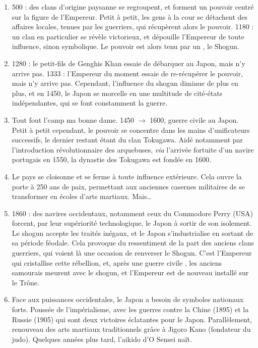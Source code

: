 \begin{enumerate}

\item 500 : des clans d'origine paysanne se regroupent, et forment un pouvoir
centré sur la figure de l'Empereur. Petit à petit, les gens à la cour se
détachent des affaires locales, tenues par les guerriers, qui récupèrent alors
le pouvoir. 1180 : un clan en particulier se révèle victorieux, et dépouille
l'Empereur de toute influence, sinon symbolique. Le pouvoir est alors tenu par
un , le Shogun.

\item 1280 : le petit-fils de Genghis Khan essaie de débarquer au Japon, mais
n'y arrive pas. 1333 : l'Empereur du moment essaie de re-récupérer le pouvoir,
mais n'y arrive pas. Cependant, l'influence du shogun diminue de plus en plus,
et en 1450, le Japon se morcelle en une multitude de cité-états indépendantes,
qui se font constamment la guerre.

\item Tout fout l'camp ma bonne dame. 1450 $\rightarrow$ 1600, guerre civile
au Japon. Petit à petit cependant, le pouvoir se concentre dans les mains
d'unificateurs successifs, le dernier restant étant du clan Tokugawa. Aidé
notamment par l'introduction révolutionnaire des arquebuses, \emph{via}
l'arrivée fortuite d'un navire portugais en 1550, la dynastie des Tokugawa est
fondée en 1600.

\item Le pays se cloisonne et se ferme à toute influence
extérieure. Cela ouvre la porte à 250 ans de paix, permettant aux anciennes
casernes militaires de se transformer en écoles d'arts martiaux. Mais\dots

\item 1860 : des navires occidentaux, notamment ceux du Commodore Perry
(\textsc{USA}) forcent, par leur supériorité technologique, le Japon à sortir
de son isolement. Le shogun accepte les traités inégaux, et le Japon
s'industrialise en sortant de sa période féodale. Cela provoque du ressentiment
de la part des anciens clans guerriers, qui voient là une occasion de renverser
le Shogun. C'est l'Empereur qui cristallise cette rébellion, et, après une
guerre civile , les anciens samourais meurent avec le shogun,
et l'Empereur est de nouveau installé sur le Trône.

\item Face aux puissances occidentales, le Japon a besoin de symboles
nationaux forts. Poussée de l'impérialisme, avec les guerres contre la Chine
(1895) et la Russie (1905) qui sont deux victoires éclatantes pour le Japon.
Parallèlement, renouveau des arts martiaux traditionnels grâce à Jigoro Kano
(fondateur du judo). Quelques années plus tard, l'aikido d'O Sensei naît.

\end{enumerate}